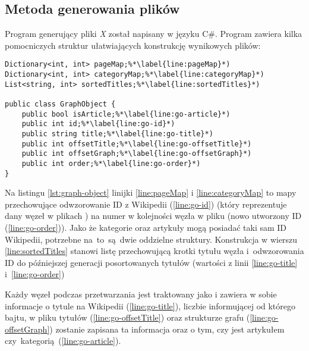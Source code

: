 

\subsection{Metoda generowania plików}

Program generujący pliki \textit{X} został napisany w języku C\#.
Program zawiera kilka pomocniczych struktur ułatwiających konstrukcję wynikowych plików:

\begin{lstlisting}[caption={Pomocnicze struktury dla programu generującego pliki dla aplikacji}, label=lst:graph-object]
Dictionary<int, int> pageMap;%*\label{line:pageMap}*)
Dictionary<int, int> categoryMap;%*\label{line:categoryMap}*)
List<string, int> sortedTitles;%*\label{line:sortedTitles}*)

public class GraphObject {
    public bool isArticle;%*\label{line:go-article}*)
    public int id;%*\label{line:go-id}*)
    public string title;%*\label{line:go-title}*)
    public int offsetTitle;%*\label{line:go-offsetTitle}*)
    public int offsetGraph;%*\label{line:go-offsetGraph}*)
    public int order;%*\label{line:go-order}*)
}
\end{lstlisting}

Na listingu \ref{lst:graph-object} linijki \ref{line:pageMap} i \ref{line:categoryMap} to mapy przechowujące odwzorowanie ID z Wikipedii (\ref{line:go-id}) (który reprezentuje dany węzeł w plikach ) na numer w kolejności węzła w pliku  (nowo utworzony ID (\ref{line:go-order})). Jako że kategorie oraz artykuły mogą posiadać taki sam ID Wikipedii, potrzebne na~to~są~dwie oddzielne struktury. Konstrukcja w wierszu \ref{line:sortedTitles} stanowi listę przechowującą krotki tytułu węzła i~odwzorowania ID do późniejszej generacji posortowanych tytułów (wartości z linii \ref{line:go-title} i~\ref{line:go-order})

Każdy węzeł podczas przetwarzania jest traktowany jako  i zawiera w sobie informacje o tytule na Wikipedii (\ref{line:go-title}), liczbie informującej od którego bajtu, w pliku tytułów  (\ref{line:go-offsetTitle}) oraz strukturze grafu  (\ref{line:go-offsetGraph}) zostanie zapisana ta informacja oraz o tym, czy jest artykułem czy~kategorią~(\ref{line:go-article}).

